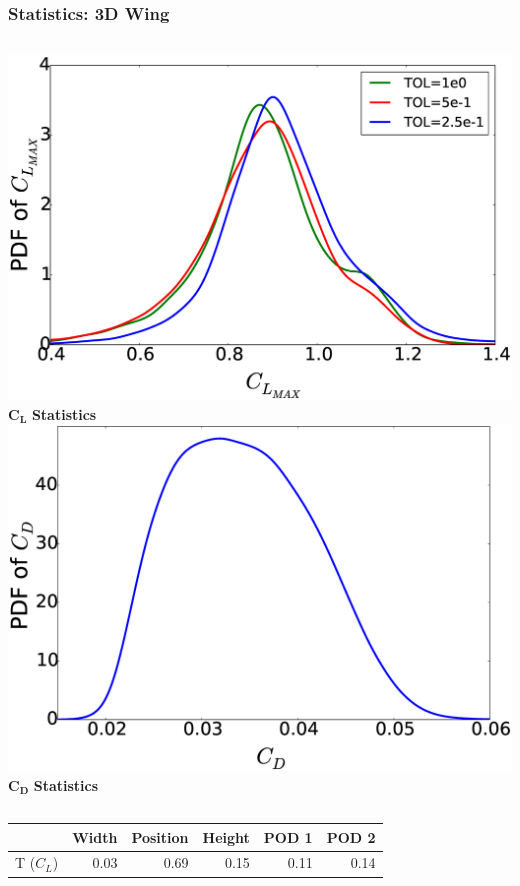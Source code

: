 \documentclass[9pt]{beamer}
\begin{document}
\begin{frame}
\frametitle{Statistics: 3D Wing}
\label{sec-2-8}


\begin{columns}[c]
    \centering
    \includegraphics[width=1\textwidth]{PDFCLMAX} \\
    $\bm{C_L}$ {\bf Statistics}
    \centering
    \includegraphics[width=1\textwidth]{PDFCDMAX} \\
    $\bm{C_D}$ {\bf Statistics}
\end{columns}



\begin{center}
\begin{tabular}{lrrrrr}
            &  Width  &  Position  &  Height  &  POD 1  &  POD 2  \\
\hline
 T ($C_L$)  &   0.03  &      0.69  &    0.15  &   0.11  &   0.14  \\
\end{tabular}
\end{center}




\end{frame}
\end{document}
